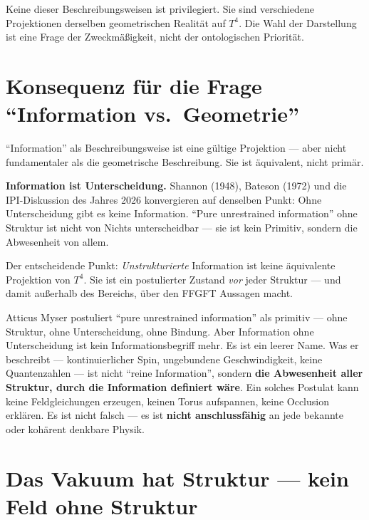 Keine dieser Beschreibungsweisen ist privilegiert. Sie sind verschiedene Projektionen derselben geometrischen Realität auf $T^4$. Die Wahl der Darstellung ist eine Frage der Zweckmäßigkeit, nicht der ontologischen Priorität.

\section{Konsequenz für die Frage ``Information vs.\ Geometrie''}

``Information'' als Beschreibungsweise ist eine gültige Projektion --- aber nicht fundamentaler als die geometrische Beschreibung. Sie ist äquivalent, nicht primär.

\begin{keyresult}
\textbf{Information ist Unterscheidung.} Shannon (1948), Bateson (1972) und die IPI-Diskussion des Jahres 2026 \cite{Kriger2026} konvergieren auf denselben Punkt: Ohne Unterscheidung gibt es keine Information. ``Pure unrestrained information'' ohne Struktur ist nicht von Nichts unterscheidbar --- sie ist kein Primitiv, sondern die Abwesenheit von allem.
\end{keyresult}

Der entscheidende Punkt: \emph{Unstrukturierte} Information ist keine äquivalente Projektion von $T^4$. Sie ist ein postulierter Zustand \emph{vor} jeder Struktur --- und damit außerhalb des Bereichs, über den FFGFT Aussagen macht.

\begin{erkenntnis}
Atticus Myser postuliert ``pure unrestrained information'' als primitiv --- ohne Struktur, ohne Unterscheidung, ohne Bindung. Aber Information ohne Unterscheidung ist kein Informationsbegriff mehr. Es ist ein leerer Name. Was er beschreibt --- kontinuierlicher Spin, ungebundene Geschwindigkeit, keine Quantenzahlen --- ist nicht ``reine Information'', sondern \textbf{die Abwesenheit aller Struktur, durch die Information definiert wäre}. Ein solches Postulat kann keine Feldgleichungen erzeugen, keinen Torus aufspannen, keine Occlusion erklären. Es ist nicht falsch --- es ist \textbf{nicht anschlussfähig} an jede bekannte oder kohärent denkbare Physik.
\end{erkenntnis}

\section{Das Vakuum hat Struktur --- kein Feld ohne Struktur}

